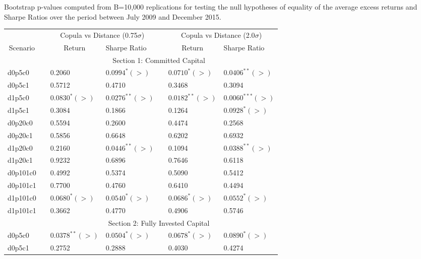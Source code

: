 \documentclass[a4paper]{article}
\begin{document}
	\begin{threeparttable}[H]
		\centering \scriptsize
		\caption{Bootstrap p-values computed from B=10,000 replications for testing the null hypotheses of equality of the average excess returns and Sharpe Ratios over the period between July 2009 and December 2015.}
		\begin{tabularx}{\textwidth}{@{\extracolsep{\fill}}lllllll@{}}
			\toprule
			& & \multicolumn{2}{c}{Copula vs Distance (0.75$\sigma$)} & \multicolumn{1}{c}{} & \multicolumn{2}{c}{Copula vs Distance (2.0$\sigma$)} \\
			\cmidrule{3-4}  \cmidrule{6-7}
			\multicolumn{1}{c}{Scenario} & & \multicolumn{1}{c}{Return} & Sharpe Ratio &       & \multicolumn{1}{c}{Return}& Sharpe Ratio \\
			\midrule
			& \multicolumn{6}{c}{Section 1: Committed Capital} \\
			\midrule
			d0p5c0 & & 0.2060 & $0.0994^{*}(>)$ &       & $0.0710^{*}(>)$ & $0.0406^{**}(>)$ \\
			d0p5c1 & & 0.5712 & 0.4710 &       & 0.3468 & 0.3094 \\
			d1p5c0 & & $0.0830^{*}(>)$ & $0.0276^{**}(>)$ &       & $0.0182^{**}(>)$ & $0.0060^{***}(>)$ \\
			d1p5c1 & & 0.3084 & 0.1866 &       & 0.1264 & $0.0928^{*}(>)$ \\
			d0p20c0 & & 0.5594 & 0.2600 &       & 0.4474 & 0.2568 \\
			d0p20c1 & & 0.5856 & 0.6648 &       & 0.6202 & 0.6932 \\
			d1p20c0 & & 0.2160 & $0.0446^{**}(>)$ &       & 0.1094 & $0.0388^{**}(>)$ \\
			d1p20c1 & & 0.9232 & 0.6896 &       & 0.7646 & 0.6118 \\
			d0p101c0 & & 0.4992 & 0.5374 &       & 0.5090 & 0.5412 \\
			d0p101c1 & & 0.7700 & 0.4760 &       & 0.6410 & 0.4494 \\
			d1p101c0 & & $0.0680^{*}(>)$ & $0.0540^{*}(>)$ &       & $0.0686^{*}(>)$ & $0.0552^{*}(>)$ \\
			d1p101c1 & & 0.3662 & 0.4770 &       & 0.4906 & 0.5746 \\
			\midrule
			& \multicolumn{6}{c}{Section 2:  Fully Invested Capital } \\
			\midrule
			d0p5c0 & & $0.0378^{**}(>)$ & $0.0504^{*}(>)$ &       & $0.0678^{*}(>)$ & $0.0890^{*}(>)$ \\
			d0p5c1 & & 0.2752 & 0.2888 &       & 0.4030 & 0.4274 \\

\end{tabularx}
\end{threeparttable}
\end{document}
